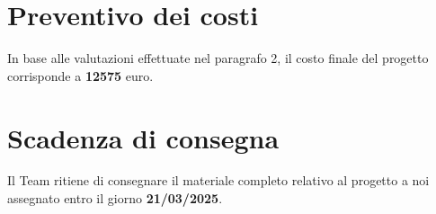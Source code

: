\documentclass{article}
\begin{document}
\section{Preventivo dei costi}
In base alle valutazioni effettuate nel paragrafo 2, il costo finale del progetto corrisponde a \textbf{12575} euro.

\section{Scadenza di consegna}
Il Team ritiene di consegnare il materiale completo relativo al progetto a noi assegnato entro il giorno \textbf{21/03/2025}.
\end{document}
